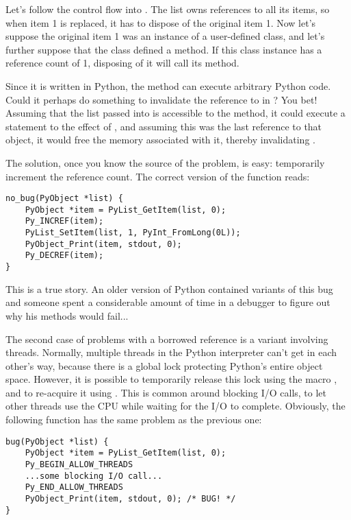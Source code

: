 \documentclass[twoside,openright]{report}
\begin{document}
Let's follow the control flow into .  The list
owns references to all its items, so when item 1 is replaced, it has
to dispose of the original item 1.  Now let's suppose the original
item 1 was an instance of a user-defined class, and let's further
suppose that the class defined a  method.  If this
class instance has a reference count of 1, disposing of it will call
its  method.

Since it is written in Python, the  method can execute
arbitrary Python code.  Could it perhaps do something to invalidate
the reference to  in ?  You bet!  Assuming that
the list passed into  is accessible to the
 method, it could execute a statement to the effect of
, and assuming this was the last reference to that
object, it would free the memory associated with it, thereby
invalidating .

The solution, once you know the source of the problem, is easy:
temporarily increment the reference count.  The correct version of the
function reads:

\bcode\begin{verbatim}
no_bug(PyObject *list) {
    PyObject *item = PyList_GetItem(list, 0);
    Py_INCREF(item);
    PyList_SetItem(list, 1, PyInt_FromLong(0L));
    PyObject_Print(item, stdout, 0);
    Py_DECREF(item);
}
\end{verbatim}\ecode
%
This is a true story.  An older version of Python contained variants
of this bug and someone spent a considerable amount of time in a \C{}
debugger to figure out why his  methods would fail...

The second case of problems with a borrowed reference is a variant
involving threads.  Normally, multiple threads in the Python
interpreter can't get in each other's way, because there is a global
lock protecting Python's entire object space.  However, it is possible
to temporarily release this lock using the macro
, and to re-acquire it using
.  This is common around blocking I/O
calls, to let other threads use the CPU while waiting for the I/O to
complete.  Obviously, the following function has the same problem as
the previous one:

\bcode\begin{verbatim}
bug(PyObject *list) {
    PyObject *item = PyList_GetItem(list, 0);
    Py_BEGIN_ALLOW_THREADS
    ...some blocking I/O call...
    Py_END_ALLOW_THREADS
    PyObject_Print(item, stdout, 0); /* BUG! */
}
\end{verbatim}\ecode
%
\end{document}
